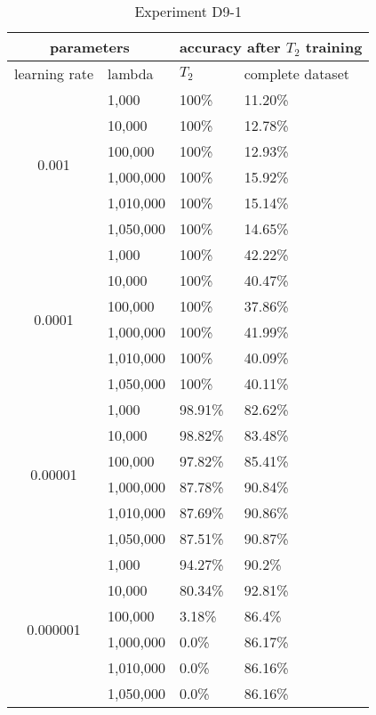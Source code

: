 \begin{table}[H]
    \centering
    \begin{tabular}{ |c|l|l|l|  }
        \hline
        \multicolumn{2}{|c|}{parameters} & \multicolumn{2}{c|}{accuracy after $T_2$ training} \\
        \hline
        learning rate & lambda & $T_2$ & complete dataset\\
        \hline
        \hline
        \multirow{6}{*}{0.001} & 1,000 & 100\% & 11.20\%\\
                            & 10,000 & 100\% & 12.78\%\\
                            & 100,000 & 100\% & 12.93\% \\
                            & 1,000,000 & 100\% & 15.92\% \\
                            & 1,010,000 & 100\% & 15.14\% \\
                            & 1,050,000 & 100\% & 14.65\% \\
        \hline
        \multirow{6}{*}{0.0001} & 1,000 & 100\% & 42.22\%\\
                                & 10,000 & 100\% & 40.47\%\\
                                & 100,000 & 100\% & 37.86\% \\
                                & 1,000,000 & 100\% & 41.99\% \\
                                & 1,010,000 & 100\% & 40.09\% \\
                                & 1,050,000 & 100\% & 40.11\% \\
        \hline
        \multirow{6}{*}{0.00001} & 1,000 & 98.91\% & 82.62\%\\
                                & 10,000 & 98.82\% & 83.48\%\\
                                & 100,000 & 97.82\% & 85.41\% \\
                                & 1,000,000 & 87.78\% & 90.84\% \\
                                & 1,010,000 & 87.69\% & 90.86\% \\
                                & 1,050,000 & 87.51\% & 90.87\% \\
        \hline
        \multirow{6}{*}{0.000001} & 1,000 & 94.27\% & 90.2\% \\
                                & 10,000 & 80.34\% & 92.81\% \\
                                & 100,000 & 3.18\% & 86.4\% \\
                                & 1,000,000 & 0.0\% & 86.17\% \\
                                & 1,010,000 & 0.0\% & 86.16\% \\
                                & 1,050,000 & 0.0\% & 86.16\% \\
        \hline
    \end{tabular}
    \caption{Experiment D9-1}
    \label{table:exp_d9-1}
\end{table}

